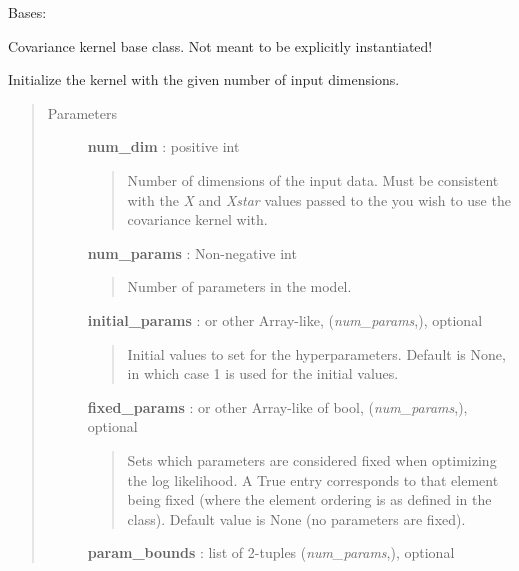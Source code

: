 \documentclass[letterpaper,10pt,english]{sphinxmanual}
\begin{document}
\begin{fulllineitems}
\label{gptools.kernel:gptools.kernel.core.Kernel}
Bases: 

Covariance kernel base class. Not meant to be explicitly instantiated!

Initialize the kernel with the given number of input dimensions.
\begin{quote}\begin{description}
\item[{Parameters }] \leavevmode
\textbf{num\_dim} : positive int
\begin{quote}

Number of dimensions of the input data. Must be consistent with the \emph{X}
and \emph{Xstar} values passed to the {\hyperref[gptools:gptools.gaussian_process.GaussianProcess]{}} you wish
to use the covariance kernel with.
\end{quote}

\textbf{num\_params} : Non-negative int
\begin{quote}

Number of parameters in the model.
\end{quote}

\textbf{initial\_params} :  or other Array-like, (\emph{num\_params},), optional
\begin{quote}

Initial values to set for the hyperparameters. Default is None, in
which case 1 is used for the initial values.
\end{quote}

\textbf{fixed\_params} :  or other Array-like of bool, (\emph{num\_params},), optional
\begin{quote}

Sets which parameters are considered fixed when optimizing the log
likelihood. A True entry corresponds to that element being
fixed (where the element ordering is as defined in the class).
Default value is None (no parameters are fixed).
\end{quote}

\textbf{param\_bounds} : list of 2-tuples (\emph{num\_params},), optional
\begin{quote}


\end{quote}
\end{description}
\end{quote}
\end{fulllineitems}
\end{document}
